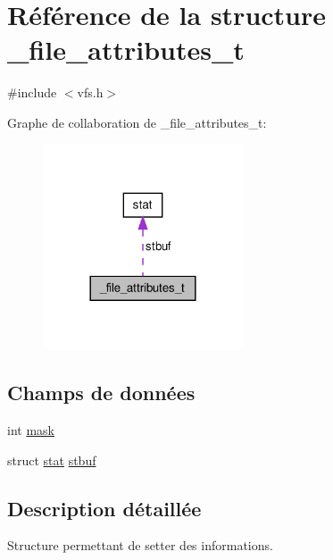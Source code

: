 \hypertarget{struct__file__attributes__t}{\section{\-Référence de la structure \-\_\-file\-\_\-attributes\-\_\-t}
\label{struct__file__attributes__t}
}


{\ttfamily \#include $<$vfs.\-h$>$}



\-Graphe de collaboration de \-\_\-file\-\_\-attributes\-\_\-t\-:\nopagebreak
\begin{figure}[H]
\begin{center}
\leavevmode
\includegraphics[width=168pt]{struct__file__attributes__t__coll__graph}
\end{center}
\end{figure}
\subsection*{\-Champs de données}
\begin{DoxyCompactItemize}
\item 
int \hyperlink{struct__file__attributes__t_a51072887a2d07ba9e5566cef453c3707}{mask}
\item 
struct \hyperlink{structstat}{stat} \hyperlink{struct__file__attributes__t_aa42b25ef9e64509420c287ab6b60c8a8}{stbuf}
\end{DoxyCompactItemize}


\subsection{\-Description détaillée}
\-Structure permettant de setter des informations. 

